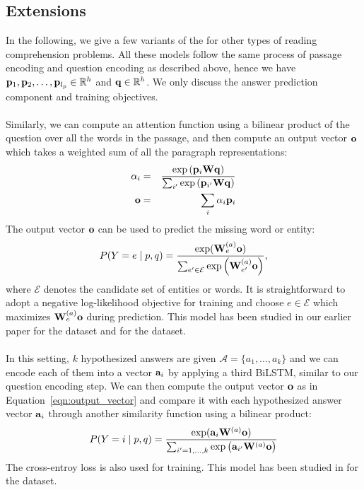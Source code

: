 \subsection{Extensions}
In the following, we give a few variants of the  for other types of reading comprehension problems.
All these models follow the same process of passage encoding and question encoding as described above, hence we have $\mathbf{p}_1, \mathbf{p}_2, \ldots, \mathbf{p}_{l_p} \in \mathbb{R}^h$ and $\mathbf{q} \in \mathbb{R}^h$. We only discuss the answer prediction component and training objectives.

\paragraph{} Similarly, we can compute an attention function using a bilinear product of the question over all the words in the passage, and then compute an output vector $\mathbf{o}$ which takes a weighted sum of all the paragraph representations:
\begin{eqnarray}
    \alpha_i & = & \frac{\exp\left(\mathbf{p}_i \mathbf{W} \mathbf{q}\right)}{\sum_{i'}\exp\left(\mathbf{p}_{i'} \mathbf{W} \mathbf{q}\right)} \\
    \mathbf{o} & = & \sum_{i}{\alpha_i \mathbf{p}_i}   \label{eqn:output_vector}
\end{eqnarray}
The output vector $\mathbf{o}$ can be used to predict the missing word or entity:
\begin{equation}
    P(Y = e \mid p, q) = \frac{\exp(\mathbf{W}^{(a)}_e \mathbf{o})}{\sum_{e' \in \mathcal{E}}\exp\left(\mathbf{W}^{(a)}_{e'} \mathbf{o}\right)},
\end{equation}
where $\mathcal{E}$ denotes the candidate set of entities or words. It is straightforward to adopt a negative log-likelihood objective for training and choose $e \in \mathcal{E}$ which maximizes $\mathbf{W}^{(a)}_{e} \mathbf{o}$ during prediction. This model has been studied in our earlier paper \cite{chen2016thorough} for the  dataset and \cite{onishi2016did} for the  dataset.

\paragraph{} In this setting, $k$ hypothesized answers are given $\mathcal{A} = \{a_1, \ldots, a_k\}$ and we can encode each of them into a vector $\mathbf{a}_i$ by applying a third BiLSTM, similar to our question encoding step. We can then compute the output vector $\mathbf{o}$ as in Equation~\ref{eqn:output_vector} and compare it with each hypothesized answer vector $\mathbf{a}_i$ through another similarity function using a bilinear product:
\begin{equation}
    P(Y = i \mid p, q) = \frac{\exp(\mathbf{a}_i \mathbf{W}^{(a)} \mathbf{o})}{\sum_{i'=1, \ldots, k}\exp\left(\mathbf{a}_{i'}\mathbf{W}^{(a)} \mathbf{o}\right)}
\end{equation}
The cross-entroy loss is also used for training. This model has been studied in  for the  dataset.


